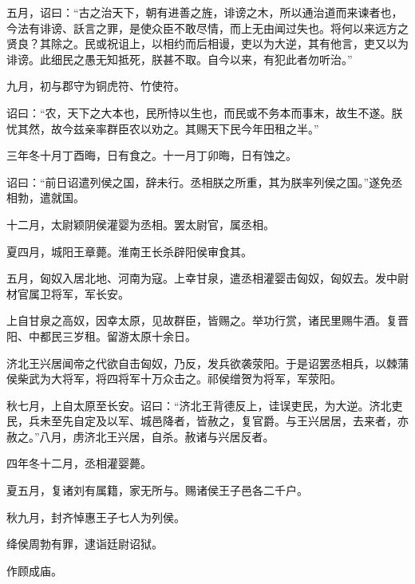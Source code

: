 \documentclass[12pt,UTF8]{ctexbook}
\begin{document}
五月，诏曰：“古之治天下，朝有进善之旌，诽谤之木，所以通治道而来谏者也，今法有诽谤、訞言之罪，是使众臣不敢尽情，而上无由闻过失也。将何以来远方之贤良？其除之。民或祝诅上，以相约而后相谩，吏以为大逆，其有他言，吏又以为诽谤。此细民之愚无知抵死，朕甚不取。自今以来，有犯此者勿听治。”



九月，初与郡守为铜虎符、竹使符。



诏曰：“农，天下之大本也，民所恃以生也，而民或不务本而事末，故生不遂。朕忧其然，故今兹亲率群臣农以劝之。其赐天下民今年田租之半。”



三年冬十月丁酉晦，日有食之。十一月丁卯晦，日有蚀之。



诏曰：“前日诏遣列侯之国，辞未行。丞相朕之所重，其为朕率列侯之国。”遂免丞相勃，遣就国。



十二月，太尉颖阴侯灌婴为丞相。罢太尉官，属丞相。



夏四月，城阳王章薨。淮南王长杀辟阳侯审食其。



五月，匈奴入居北地、河南为寇。上幸甘泉，遣丞相灌婴击匈奴，匈奴去。发中尉材官属卫将军，军长安。



上自甘泉之高奴，因幸太原，见故群臣，皆赐之。举功行赏，诸民里赐牛酒。复晋阳、中都民三岁租。留游太原十余日。



济北王兴居闻帝之代欲自击匈奴，乃反，发兵欲袭荥阳。于是诏罢丞相兵，以棘蒲侯柴武为大将军，将四将军十万众击之。祁侯缯贺为将军，军荥阳。



秋七月，上自太原至长安。诏曰：“济北王背德反上，诖误吏民，为大逆。济北吏民，兵未至先自定及以军、城邑降者，皆赦之，复官爵。与王兴居居，去来者，亦赦之。”八月，虏济北王兴居，自杀。赦诸与兴居反者。



四年冬十二月，丞相灌婴薨。



夏五月，复诸刘有属籍，家无所与。赐诸侯王子邑各二千户。



秋九月，封齐悼惠王子七人为列侯。



绛侯周勃有罪，逮诣廷尉诏狱。



作顾成庙。
\end{document}
